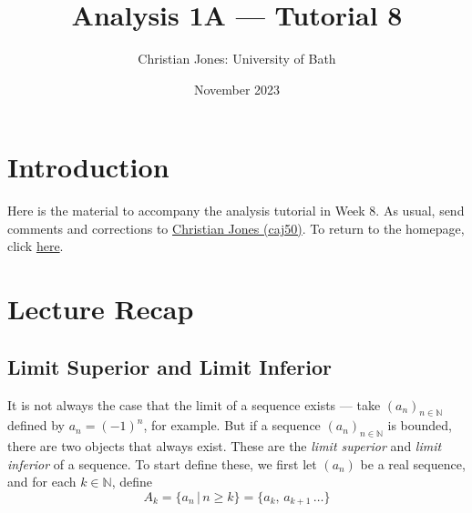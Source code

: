 \documentclass[
  12pt,
  a4paper]{extarticle}
\title{Analysis 1A --- Tutorial 8}
\author{Christian Jones: University of Bath}
\date{November 2023}
\theoremstyle{plain}
\theoremstyle{definition}
\theoremstyle{plain}
\theoremstyle{plain}
\theoremstyle{plain}
\theoremstyle{plain}
\theoremstyle{definition}
\theoremstyle{definition}
\theoremstyle{remark}
\theoremstyle{remark}
\renewcommand{\;}{\,}
\begin{document}
\maketitle

{
\setcounter{tocdepth}{2}
\tableofcontents
}
\newpage
{}

\hypertarget{introduction}{%
\section*{Introduction}\label{introduction}}

Here is the material to accompany the analysis tutorial in Week 8. As usual, send comments and corrections to \href{mailto:caj50@bath.ac.uk}{Christian Jones (caj50)}. To return to the homepage, click \href{http://caj50.github.io/tutoring.html}{here}.

\hypertarget{lecture-recap}{%
\section{Lecture Recap}\label{lecture-recap}}

\hypertarget{limit-superior-and-limit-inferior}{%
\subsection{Limit Superior and Limit Inferior}\label{limit-superior-and-limit-inferior}}

It is not always the case that the limit of a sequence exists --- take \((a_n)_{n\in\mathbb{N}}\) defined by \(a_n = (-1)^n\), for example. But if a sequence \((a_n)_{n\in\mathbb{N}}\) is bounded, there are two objects that always exist. These are the \emph{limit superior} and \emph{limit inferior} of a sequence. To start define these, we first let \((a_n)\) be a real sequence, and for each \(k \in \mathbb{N}\), define \[A_k = \lbrace a_n \,\lvert\, n \geq k\rbrace = \lbrace a_k,\,a_{k+1}\,\ldots\rbrace\]
\end{document}
